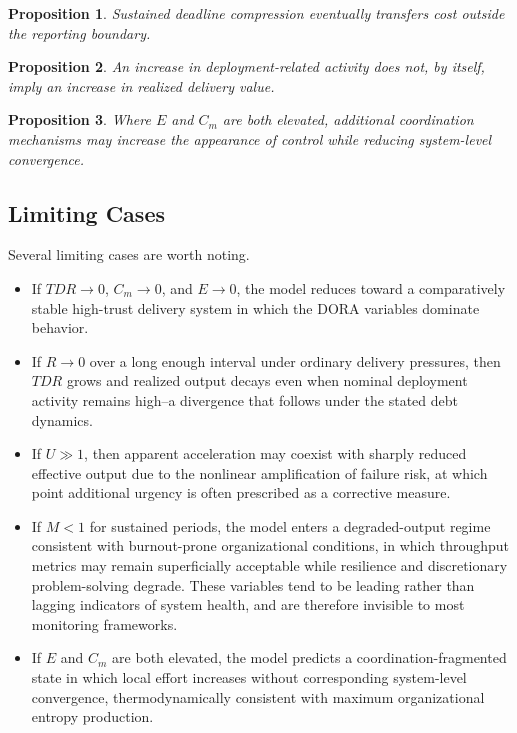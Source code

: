 \documentclass[letterpaper]{article}
\newtheorem{proposition}{Proposition}
\begin{document}
\begin{proposition}
Sustained deadline compression eventually transfers cost outside the reporting boundary.
\end{proposition}

\begin{proposition}
An increase in deployment-related activity does not, by itself, imply an increase in realized delivery value.
\end{proposition}

\begin{proposition}
Where $E$ and $C_m$ are both elevated, additional coordination mechanisms may increase the appearance of control while reducing system-level convergence.
\end{proposition}

\subsection{Limiting Cases}

Several limiting cases are worth noting.

\begin{itemize}
    \item If $TDR \to 0$, $C_m \to 0$, and $E \to 0$, the model reduces toward a comparatively stable high-trust delivery system in which the DORA variables dominate behavior.
    
    \item If $R \to 0$ over a long enough interval under ordinary delivery pressures, then $TDR$ grows and realized output decays even when nominal deployment activity remains high--a divergence that follows under the stated debt dynamics.
    
    \item If $U \gg 1$, then apparent acceleration may coexist with sharply reduced effective output due to the nonlinear amplification of failure risk, at which point additional urgency is often prescribed as a corrective measure.
    
    \item If $M < 1$ for sustained periods, the model enters a degraded-output regime consistent with burnout-prone organizational conditions, in which throughput metrics may remain superficially acceptable while resilience and discretionary problem-solving degrade. These variables tend to be leading rather than lagging indicators of system health, and are therefore invisible to most monitoring frameworks.
    
    \item If $E$ and $C_m$ are both elevated, the model predicts a coordination-fragmented state in which local effort increases without corresponding system-level convergence, thermodynamically consistent with maximum organizational entropy production.
    
\end{itemize}
\end{document}
